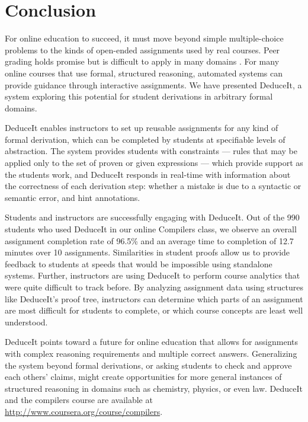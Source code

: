 \documentclass{sigchi}
\begin{document}




\section{Conclusion}

For online education to succeed, it must move beyond simple multiple-choice problems to the kinds of open-ended assignments used by real courses. Peer grading holds promise but is difficult to apply in many domains \cite{peer-consistency,chinmay-srk}. For many online courses that use formal, structured reasoning, automated systems can provide guidance through interactive assignments. We have presented DeduceIt, a system exploring this potential for student derivations in arbitrary formal domains. 

DeduceIt enables instructors to set up reusable assignments for any kind of formal derivation, which can be completed by students at specifiable levels of abstraction. The system provides students with constraints --- rules that may be applied only to the set of proven or given expressions --- which provide support as the students work, and DeduceIt responds in real-time with information about the correctness of each derivation step: whether a mistake is due to a syntactic or semantic error, and hint annotations.

Students and instructors are successfully engaging with DeduceIt. Out of the 990 students who used DeduceIt in our online Compilers class, we observe an overall assignment completion rate of 96.5\% and an average time to completion of 12.7 minutes over 10 assignments. Similarities in student proofs allow us to provide feedback to students at speeds that would be impossible using standalone systems. Further, instructors are using DeduceIt to perform course analytics that were quite difficult to track before. By analyzing assignment data using structures like DeduceIt's proof tree, instructors can determine which parts of an assignment are most difficult for students to complete, or which course concepts are least well understood.

DeduceIt points toward a future for online education that allows for assignments with complex reasoning requirements and multiple correct answers. Generalizing the system beyond formal derivations, or asking students to check and approve each others' claims, might create opportunities for more general instances of structured reasoning in domains such as chemistry, physics, or even law. DeduceIt and the compilers course are available at \url{http://www.coursera.org/course/compilers}.
\end{document}
